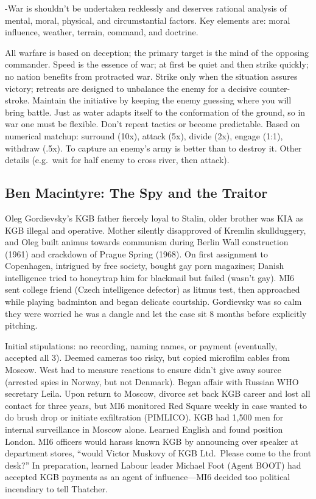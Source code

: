 \documentclass[
]{article}
\begin{document}
-War is shouldn't be undertaken recklessly and deserves rational
analysis of mental, moral, physical, and circumstantial factors. Key
elements are: moral influence, weather, terrain, command, and doctrine.

All warfare is based on deception; the primary target is the mind of the
opposing commander. Speed is the essence of war; at first be quiet and
then strike quickly; no nation benefits from protracted war. Strike only
when the situation assures victory; retreats are designed to unbalance
the enemy for a decisive counter-stroke. Maintain the initiative by
keeping the enemy guessing where you will bring battle. Just as water
adapts itself to the conformation of the ground, so in war one must be
flexible. Don't repeat tactics or become predictable. Based on numerical
matchup: surround (10x), attack (5x), divide (2x), engage (1:1),
withdraw (.5x). To capture an enemy's army is better than to destroy it.
Other details (e.g.~wait for half enemy to cross river, then attack).

\hypertarget{ben-macintyre-the-spy-and-the-traitor}{%
\subsection{Ben Macintyre: The Spy and the
Traitor}\label{ben-macintyre-the-spy-and-the-traitor}}

Oleg Gordievsky's KGB father fiercely loyal to Stalin, older brother was
KIA as KGB illegal and operative. Mother silently disapproved of Kremlin
skullduggery, and Oleg built animus towards communism during Berlin Wall
construction (1961) and crackdown of Prague Spring (1968). On first
assignment to Copenhagen, intrigued by free society, bought gay porn
magazines; Danish intelligence tried to honeytrap him for blackmail but
failed (wasn't gay). MI6 sent college friend (Czech intelligence
defector) as litmus test, then approached while playing badminton and
began delicate courtship. Gordievsky was so calm they were worried he
was a dangle and let the case sit 8 months before explicitly pitching.

Initial stipulations: no recording, naming names, or payment
(eventually, accepted all 3). Deemed cameras too risky, but copied
microfilm cables from Moscow. West had to measure reactions to ensure
didn't give away source (arrested spies in Norway, but not Denmark).
Began affair with Russian WHO secretary Leila. Upon return to Moscow,
divorce set back KGB career and lost all contact for three years, but
MI6 monitored Red Square weekly in case wanted to do brush drop or
initiate exfiltration (PIMLICO). KGB had 1,500 men for internal
surveillance in Moscow alone. Learned English and found position London.
MI6 officers would harass known KGB by announcing over speaker at
department stores, ``would Victor Muskovy of KGB Ltd.~Please come to the
front desk?'' In preparation, learned Labour leader Michael Foot (Agent
BOOT) had accepted KGB payments as an agent of influence---MI6 decided
too political incendiary to tell Thatcher.
\end{document}
